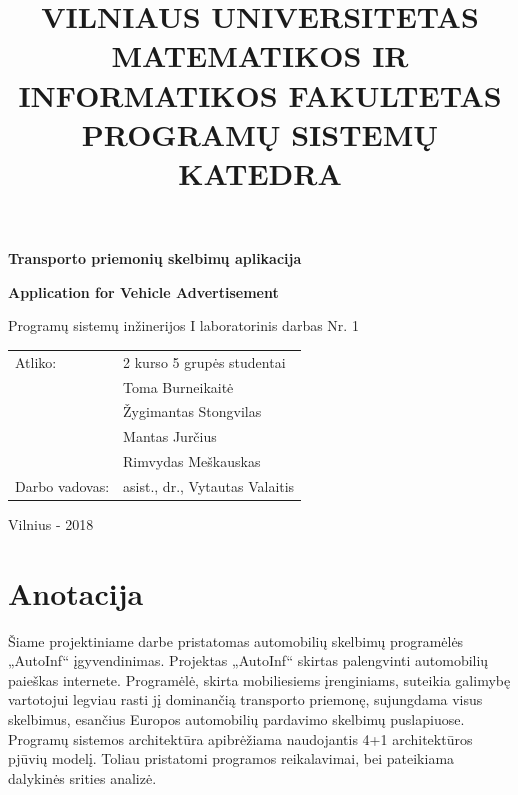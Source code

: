 \documentclass[12pt]{article}
\title{VILNIAUS UNIVERSITETAS \bigbreak \bigbreak 
MATEMATIKOS IR INFORMATIKOS FAKULTETAS \bigbreak \bigbreak 
PROGRAMŲ SISTEMŲ KATEDRA}
\author{}
\date{}
\begin{document}
	\clearpage
	\maketitle
	\thispagestyle{empty}

	\begin{center}
		\begin{Large}
			\textbf{Transporto priemonių skelbimų aplikacija} \bigbreak
		\end{Large}
		\begin{large}
			\textbf{Application for Vehicle Advertisement} \bigbreak
		\end{large}
		Programų sistemų inžinerijos I laboratorinis darbas Nr. 1 \bigbreak

		\bigbreak
		\bigbreak
		\bigbreak
		\bigbreak
		\bigbreak
		\bigbreak
		\bigbreak

		\begin{tabular}{ll}
			Atliko:        & 2 kurso 5 grupės studentai \\
		               	   & Toma Burneikaitė \\
		               	   & Žygimantas Stongvilas \\
		                   & Mantas Jurčius \\
		                   & Rimvydas Meškauskas \\
			Darbo vadovas: & asist., dr., Vytautas Valaitis
		\end{tabular}

		\bigbreak
		\bigbreak
		\bigbreak
		\bigbreak
		\bigbreak
		\bigbreak
		\bigbreak
		\bigbreak
		\bigbreak
		\bigbreak
		\bigbreak
		\bigbreak
		\bigbreak
		\bigbreak
		\bigbreak

		Vilnius - 2018
	\end{center}
	\pagebreak
	
	\section*{Anotacija}
	\begin{indent}
	Šiame projektiniame darbe pristatomas automobilių skelbimų programėlės „AutoInf“ įgyvendinimas. Projektas „AutoInf“ skirtas  palengvinti automobilių paieškas internete. Programėlė, skirta mobiliesiems įrenginiams, suteikia galimybę vartotojui legviau rasti jį dominančią transporto priemonę, sujungdama visus skelbimus, esančius Europos automobilių pardavimo skelbimų puslapiuose. Programų sistemos architektūra apibrėžiama naudojantis 4+1 architektūros pjūvių modelį. Toliau pristatomi programos reikalavimai, bei pateikiama dalykinės srities analizė.
	\end{indent}
	\pagebreak
\end{document}
